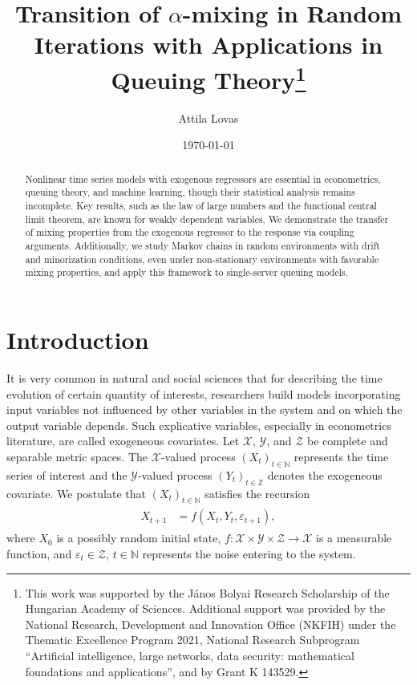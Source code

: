 \documentclass[a4paper,10pt]{article}
\title{Transition of $\alpha$-mixing in Random Iterations with Applications in Queuing Theory\thanks{This work was supported by the János Bolyai Research Scholarship of the Hungarian Academy of Sciences. Additional support was provided by the National Research, Development and Innovation Office (NKFIH) under the Thematic Excellence Program 2021, National Research Subprogram “Artificial intelligence, large networks, data security: mathematical foundations and applications”, and by Grant K 143529.}}
\author{Attila Lovas}
\affil{HUN-REN Alfr\'ed R\'enyi Institute of Mathematics, Budapest, Hungary}
\affil{Budapest University of Technology and Economics, Budapest, Hungary}
\date{\today}
\newcommand{\N}{\mathbb{N}}
\newcommand{\Z}{\mathbb{Z}}
\newcommand{\X}{\mathcal{X}}
\newcommand{\Y}{\mathcal{Y}}
\newcommand{\eps}{\varepsilon}
\begin{document}
\maketitle

\begin{abstract}	

Nonlinear time series models with exogenous regressors are essential in econometrics, queuing theory, and machine learning, though their statistical analysis remains incomplete. Key results, such as the law of large numbers and the functional central limit theorem, are known for weakly dependent variables. We demonstrate the transfer of mixing properties from the exogenous regressor to the response via coupling arguments. Additionally, we study Markov chains in random environments with drift and minorization conditions, even under non-stationary environments with favorable mixing properties, and apply this framework to single-server queuing models.
\end{abstract}


\section*{Introduction}

It is very common in natural and social sciences that for describing the time evolution of certain quantity of interests, researchers build models incorporating input variables not influenced by other variables in the system and on which the output variable depends. Such explicative variables, especially in econometrics literature, are called exogeneous covariates. 
Let $\X$, $\Y$, and $\mathcal{Z}$ be complete and separable metric spaces. The $\X$-valued process $(X_t)_{t\in\N}$ represents the time series of interest and the $\Y$-valued process $(Y_t)_{t\in\Z}$ denotes the exogeneous covariate. We postulate that $(X_t)_{t\in\N}$ satisfies the recursion
\begin{align}\label{eq:iter}
\begin{split}
X_{t+1} &= f(X_{t},Y_{t},\eps_{t+1}),
\end{split}
\end{align}
where $X_0$ is a possibly random initial state, $f:\X\times\Y\times \mathcal{Z}\to\X$ is a measurable function, and $\eps_t\in \mathcal{Z}$, $t\in\N$ represents the noise entering to the system. 
\end{document}
